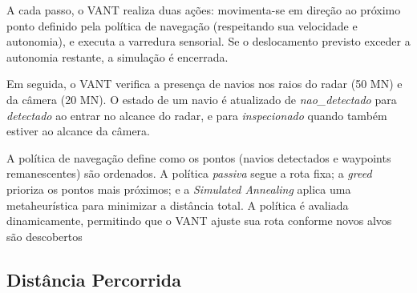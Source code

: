 A cada passo, o VANT realiza duas ações: movimenta-se em direção ao próximo ponto definido pela política de navegação (respeitando sua velocidade e autonomia), e executa a varredura sensorial. Se o deslocamento previsto exceder a autonomia restante, a simulação é encerrada.

Em seguida, o VANT verifica a presença de navios nos raios do radar (50 MN) e da câmera (20 MN). O estado de um navio é atualizado de \textit{nao\_detectado} para \textit{detectado} ao entrar no alcance do radar, e para \textit{inspecionado} quando também estiver ao alcance da câmera.

A política de navegação define como os pontos (navios detectados e waypoints remanescentes) são ordenados. A política \textit{passiva} segue a rota fixa; a \textit{greed} prioriza os pontos mais próximos; e a \textit{Simulated Annealing} aplica uma metaheurística para minimizar a distância total. A política é avaliada dinamicamente, permitindo que o VANT ajuste sua rota conforme novos alvos são descobertos






\subsection{Distância Percorrida}

